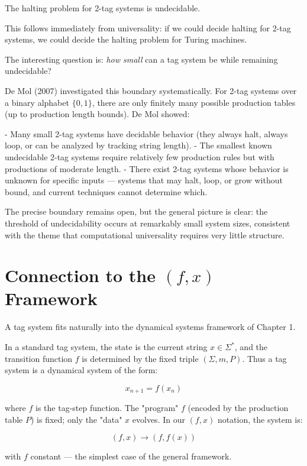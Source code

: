 \begin{theorem}
The halting problem for 2-tag systems is undecidable.

This follows immediately from universality: if we could decide halting for 2-tag systems, we could decide the halting problem for Turing machines.

The interesting question is: \textit{how small} can a tag system be while remaining undecidable?

De Mol (2007) investigated this boundary systematically. For 2-tag systems over a binary alphabet $\{ 0, 1\} $, there are only finitely many possible production tables (up to production length bounds). De Mol showed:

- Many small 2-tag systems have decidable behavior (they always halt, always loop, or can be analyzed by tracking string length).
- The smallest known undecidable 2-tag systems require relatively few production rules but with productions of moderate length.
- There exist 2-tag systems whose behavior is unknown for specific inputs --- systems that may halt, loop, or grow without bound, and current techniques cannot determine which.

The precise boundary remains open, but the general picture is clear: the threshold of undecidability occurs at remarkably small system sizes, consistent with the theme that computational universality requires very little structure.
\end{theorem}

\section{Connection to the $(f, x)$ Framework}

A tag system fits naturally into the dynamical systems framework of Chapter 1.

In a standard tag system, the state is the current string $x \in \Sigma^*$, and the transition function $f$ is determined by the fixed triple $(\Sigma, m, P)$. Thus a tag system is a dynamical system of the form:

\[x_{n+1} = f(x_n)\]

where $f$ is the tag-step function. The "program" $f$ (encoded by the production table $P$) is fixed; only the "data" $x$ evolves. In our $(f, x)$ notation, the system is:

\[(f, x) \to (f, f(x))\]

with $f$ constant --- the simplest case of the general framework.

